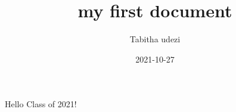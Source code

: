 \documentclass{article}
\title{my first document}
\date{2021-10-27}
\author{Tabitha udezi}
\begin{document}
	\maketitle
	\newpage
	Hello Class of 2021!
\end{document}
